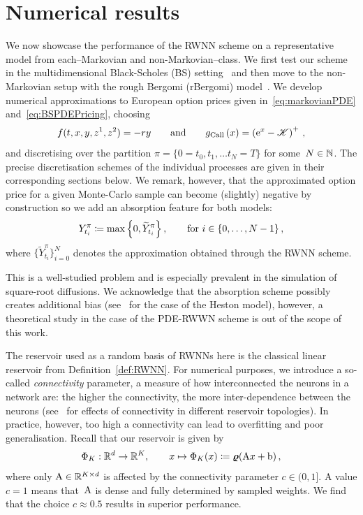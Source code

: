 \section{Numerical results}\label{sec:RWNN_numerical_results}
We now showcase the performance of the RWNN scheme on a representative model from each--Markovian and non-Markovian--class. 
We first test our scheme in the multidimensional Black-Scholes (BS) setting~\cite{Black1973TheLiabilities} and then move to the non-Markovian setup with the rough Bergomi (rBergomi) model~\cite{Bayer2015PricingVolatility}. 
We develop numerical approximations to European option prices given in~\eqref{eq:markovianPDE} and~\eqref{eq:BSPDEPricing}, choosing
\[
f(t, x, y, z^1, z^2) = -r y
\qquad \text {and} \qquad 
g_{\textup{Call}}\left(x\right) = \left(\mathrm{e}^x-\mathscr{K}\right)^{+}\,,
\]
and discretising over the partition $\pi=\{0=t_0, t_1, \dots t_N=T\}$ for some~$N\in\mathbb{N}$. 
The precise discretisation schemes of the individual processes are given in their corresponding sections below. 
We remark, however, that the approximated option price for a given Monte-Carlo sample can become (slightly) negative by construction so we add an absorption feature for both models:
\begin{equation}\label{eq:absorption_scheme}
Y^\pi_{t_i} \coloneqq  \max\left\{0,\widetilde Y^\pi_{t_i}\right\}, \qquad \text{for } i\in\{0, \dots, N-1\}\,,
\end{equation}
where $\big\{\widetilde Y^\pi_{t_i}\big\}_{i=0}^N$ denotes the approximation obtained through the RWNN scheme.


\begin{remark}\label{rem:abs_scheme}
    This is a well-studied problem and is especially prevalent in the simulation of square-root diffusions. We acknowledge that the absorption scheme possibly creates additional bias (see~\cite{Lord2009AModels} for the case of the Heston model), however, a theoretical study in the case of the PDE-RWWN scheme is out of the scope of this work.
\end{remark}

The reservoir used as a random basis of RWNNs here is the classical linear reservoir from Definition~\ref{def:RWNN}. 
For numerical purposes, we introduce a so-called \textit{connectivity} parameter, a measure of how interconnected the neurons in a network are:
the higher the connectivity, the more inter-dependence between the neurons (see~\cite{Dale2021ReservoirTopology} for effects of connectivity in different reservoir topologies). 
In practice, however, too high a connectivity can lead to overfitting and poor generalisation. 
Recall that our reservoir is given by
\[
\Phi_K: \mathbb{R}^d \rightarrow \mathbb{R}^K, \qquad x\mapsto\Phi_K(x)\coloneqq\boldsymbol\varrho(\mathrm{A} x+\mathrm{b})\,,
\]
where only $\mathrm{A}\in\mathbb{R}^{K\times d}$ is affected by the connectivity parameter $c\in(0,1]$. 
A value $c=1$ means that~$\mathrm{A}$ is dense and fully determined by sampled weights. 
We find that the choice $c\approx 0.5$ results in superior performance.

